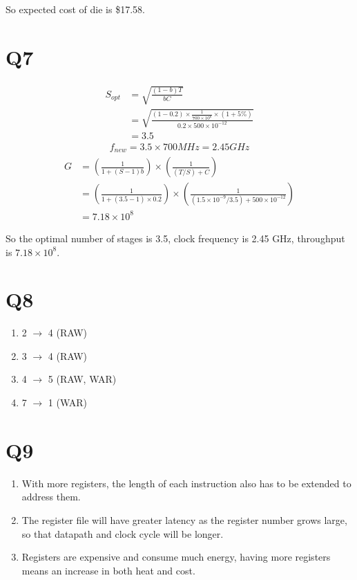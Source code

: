 \documentclass[12pt]{article}
\begin{document}
So expected cost of die is \$17.58.

\section*{Q7}

\begin{align*}
	S_{opt} &= \sqrt{\frac{(1-b)T}{bC}}\\
	&= \sqrt{\frac{(1-0.2)\times \frac{1}{700\times 10^{6}} \times (1+5\%)}{0.2 \times 500\times 10^{-12}}}\\
	&= 3.5
\end{align*}
\begin{align*}
	f_{new} = 3.5 \times 700MHz = 2.45GHz
\end{align*}
\begin{align*}
	G &= (\frac{1}{1+(S-1)b})\times(\frac{1}{(T/S)+C})\\
	&= (\frac{1}{1+(3.5-1)\times 0.2})\times(\frac{1}{(1.5\times 10^{-9}/3.5)+500\times 10^{-12}})\\
	&= 7.18 \times 10^8
\end{align*}

So the optimal number of stages is 3.5, clock frequency is 2.45 GHz, throughput is $7.18 \times 10^8$.

\section*{Q8}

\begin{enumerate}[1)]
	\item 2 $\rightarrow$ 4 (RAW)
	\item 3 $\rightarrow$ 4 (RAW)
	\item 4 $\rightarrow$ 5 (RAW, WAR)
	\item 7 $\rightarrow$ 1 (WAR)
\end{enumerate}

\section*{Q9}

\begin{enumerate}
	\item With more registers, the length of each instruction also has to be extended to address them.
	\item The register file will have greater latency as the register number grows large, so that datapath and clock cycle will be longer.
	\item Registers are expensive and consume much energy, having more registers means an increase in both heat and cost.
\end{enumerate}
\end{document}
